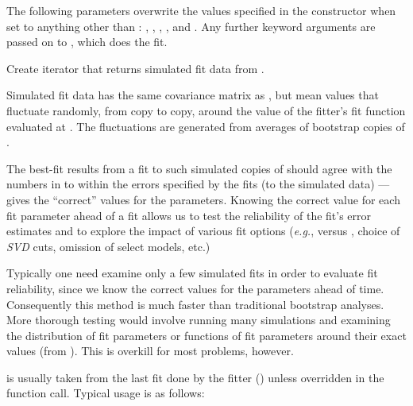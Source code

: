 \documentclass[letterpaper,10pt,english]{sphinxmanual}
\begin{document}
\begin{fulllineitems}
\begin{fulllineitems}
The following parameters overwrite the values specified in the
{\hyperref[corrfitter:corrfitter.CorrFitter]{}} constructor when set to anything other than :
, , , , and . Any
further keyword arguments are passed on to
, which does the fit.

\end{fulllineitems}


\begin{fulllineitems}
\label{corrfitter:corrfitter.CorrFitter.simulated_data_iter}
Create iterator that returns simulated fit data from .

Simulated fit data has the same covariance matrix as 
, but mean values that 
fluctuate randomly, from copy to copy, around
the value of the fitter's fit function evaluated at . 
The fluctuations are generated from averages of bootstrap copies
of .

The best-fit results from a fit to such simulated copies of   
should agree with the numbers in  to within the errors specified
by the fits (to the simulated data) ---  gives the ``correct'' 
values for the parameters. Knowing the correct value for each 
fit parameter ahead of a fit allows us to test the reliability of
the fit's error estimates and to explore the impact of various fit 
options (\emph{e.g.},  versus , 
choice of \emph{SVD} cuts, omission of select models, etc.)

Typically one need examine only a few simulated fits in order 
to evaluate fit reliability, since we know the correct values
for the parameters ahead of time. Consequently this method is
much faster than traditional bootstrap analyses. More 
thorough testing would involve running many simulations and
examining the distribution of fit parameters or functions 
of fit parameters around their exact values (from ). 
This is overkill for most problems, however.

 is usually taken from the last fit done by the fitter 
() unless overridden in the function call.
Typical usage is as follows:


\end{fulllineitems}
\end{fulllineitems}
\end{document}
